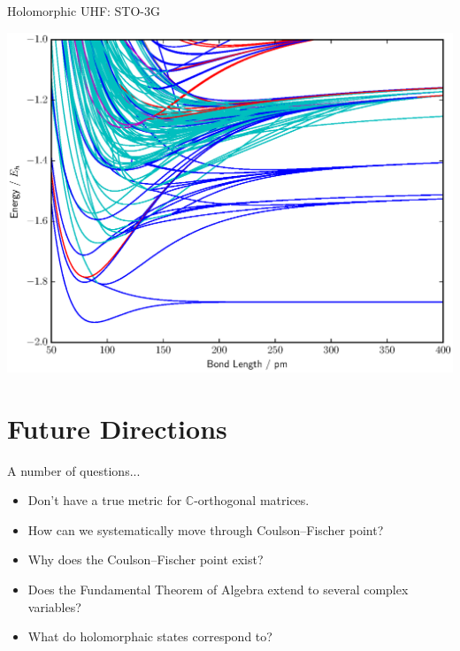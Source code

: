 \documentclass{beamer}
\begin{document}
\begin{frame}{Holomorphic UHF:  STO-3G}
\vspace{-0.9em}
  \begin{center}
    \includegraphics[scale=0.45]{20161219_ThomGroup_Update/BFGS_UHF_H4_rect_sto-3g}
  \end{center}
\end{frame}


\section{Future Directions}
\begin{frame}{A number of questions...}
 \begin{itemize}
  \item{Don't have a true metric for $\mathbb{C}$-orthogonal matrices.}
  \item{How can we systematically move through Coulson--Fischer point?}
  \item{Why does the Coulson--Fischer point exist?}
  \item{Does the Fundamental Theorem of Algebra extend to several complex variables?}
  \item{What do holomorphaic states correspond to?}
 \end{itemize}
\end{frame}
\end{document}
